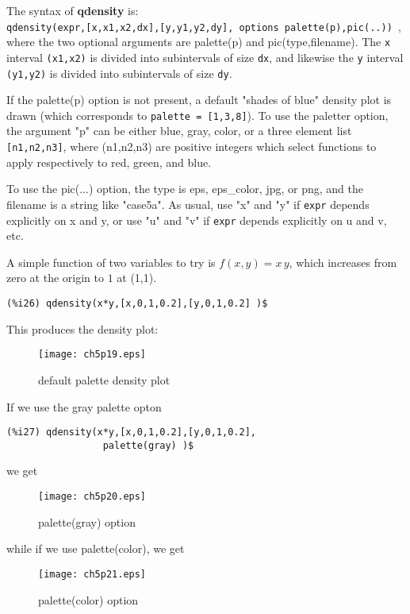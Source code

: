 \documentclass[12pt]{article}
\begin{document}
\smallskip
  
The syntax of \textbf{qdensity} is:\\
\verb|qdensity(expr,[x,x1,x2,dx],[y,y1,y2,dy], options palette(p),pic(..)) |,
  where the two optional arguments are palette(p) and pic(type,filename).
The \verb|x| interval \verb|(x1,x2)| is divided into subintervals of size \verb|dx|,
  and likewise the \verb|y| interval \verb|(y1,y2)| is divided into subintervals
  of size \verb|dy|.  
\smallskip

If the palette(p) option is not present, a default "shades of blue"
   density plot is drawn (which corresponds to \verb|palette = [1,3,8]|).
To use the paletter option, the argument "p" can be either blue, gray,
   color, or a three element list \verb|[n1,n2,n3]|, where (n1,n2,n3) are positive integers which
   select functions to apply respectively to red, green, and blue.

\smallskip

To use the pic(...) option, the type is eps, eps\_color, jpg, or png,
and the filename is a string like "case5a".
As usual, use "x" and "y" if \verb|expr| depends explicitly on x and y,
or use "u" and "v" if \verb|expr| depends explicitly on u and v, etc.

\smallskip
A simple function of two variables to try is $f(x,y) = x\,y$, which increases from
  zero at the origin to $1$ at (1,1).
\small
\begin{verbatim}
(%i26) qdensity(x*y,[x,0,1,0.2],[y,0,1,0.2] )$
\end{verbatim}
\normalsize

This produces the density plot:
\begin{figure} [h]
   \centerline{\texttt{[image: ch5p19.eps]} }
	\caption{default palette density plot }
\end{figure}      
\newpage
If we use the gray palette opton
\small
\begin{verbatim}
(%i27) qdensity(x*y,[x,0,1,0.2],[y,0,1,0.2],
                 palette(gray) )$
\end{verbatim}
\normalsize
we get
\begin{figure} [h]
   \centerline{\texttt{[image: ch5p20.eps]} }
	\caption{palette(gray) option }
\end{figure}      


\smallskip
while if we use palette(color), we get
\begin{figure} [h]
   \centerline{\texttt{[image: ch5p21.eps]} }
	\caption{palette(color) option }
\end{figure}      
\end{document}

